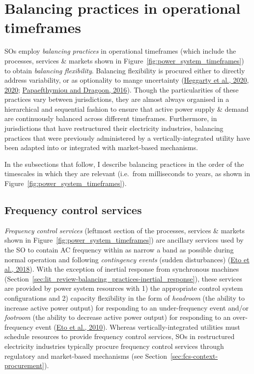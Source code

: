 \documentclass[12pt,a4paper,]{report}
\begin{document}
\hypertarget{sec:lit_review-balancing_practices}{%
\section{Balancing practices in operational
timeframes}\label{sec:lit_review-balancing_practices}}

SOs employ \emph{balancing practices} in operational timeframes (which
include the processes, services \& markets shown in
Figure~\ref{fig:power_system_timeframes}) to obtain \emph{balancing
flexibility}. Balancing flexibility is procured either to directly
address variability, or as optionality to mange uncertainty
(\protect\hyperlink{ref-heggartyQuantifyingPowerSystem2020}{Heggarty et
al., 2020},
\protect\hyperlink{ref-heggartyQuantifyingPowerSystem2020}{2020};
\protect\hyperlink{ref-papaefthymiou100RenewableEnergy2016}{Papaefthymiou
and Dragoon, 2016}). Though the particularities of these practices vary
between jurisdictions, they are almost always organised in a
hierarchical and sequential fashion to ensure that active power supply
\& demand are continuously balanced across different timeframes.
Furthermore, in jurisdictions that have restructured their electricity
industries, balancing practices that were previously administered by a
vertically-integrated utility have been adapted into or integrated with
market-based mechanisms.

In the subsections that follow, I describe balancing practices in the
order of the timescales in which they are relevant (i.e.~from
milliseconds to years, as shown in
Figure~\ref{fig:power_system_timeframes}).

\hypertarget{sec:lit_review-balancing_practices-fcs}{%
\subsection{Frequency control
services}\label{sec:lit_review-balancing_practices-fcs}}

\emph{Frequency control services} (leftmost section of the processes,
services \& markets shown in Figure~\ref{fig:power_system_timeframes})
are ancillary services used by the SO to contain AC frequency within as
narrow a band as possible during normal operation and following
\emph{contingency events} (sudden disturbances)
(\protect\hyperlink{ref-etoFrequencyControlRequirements2018}{Eto et al.,
2018}). With the exception of inertial response from synchronous
machines
(Section~\ref{sec:lit_review-balancing_practices-inertial_response}),
these services are provided by power system resources with 1) the
appropriate control system configurations and 2) capacity flexibility in
the form of \emph{headroom} (the ability to increase active power
output) for responding to an under-frequency event and/or
\emph{footroom} (the ability to decrease active power output) for
responding to an over-frequency event
(\protect\hyperlink{ref-etoUseFrequencyResponse2010}{Eto et al., 2010}).
Whereas vertically-integrated utilities must schedule resources to
provide frequency control services, SOs in restructured electricity
industries typically procure frequency control services through
regulatory and market-based mechanisms (see
Section~\ref{sec:fcs-context-procurement}).
\end{document}
